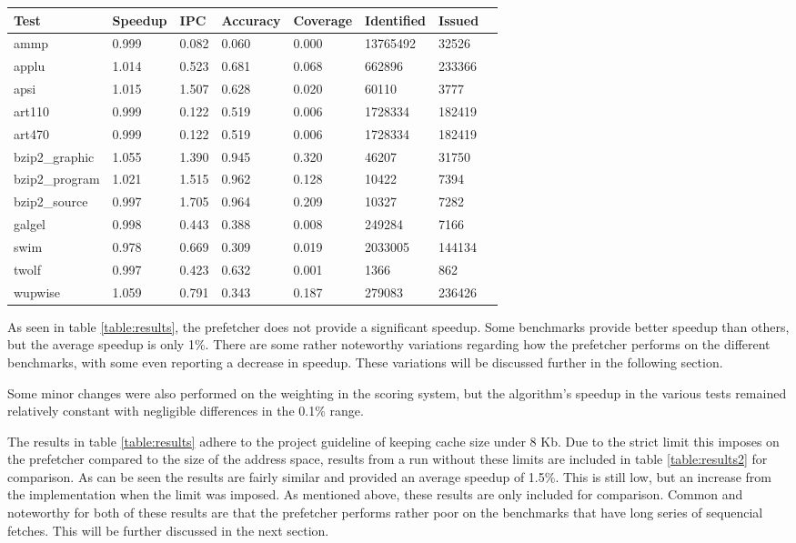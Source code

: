 

\begin{table*}[!t]
\renewcommand{\arraystretch}{1.3}
\caption{Prefetcher results from the Kongull Cluster}
\label{table:results}
\centering
\begin{tabular}{|l|l|l|l|l|l|l|l|}
\hline
\bfseries Test & \bfseries Speedup & \bfseries IPC & \bfseries Accuracy & \bfseries Coverage & \bfseries Identified & \bfseries Issued\\
\hline
\hline
ammp 		& 0.999 & 0.082 & 0.060 & 0.000 & 13765492 & 32526\\
applu 		& 1.014 & 0.523 & 0.681 & 0.068 & 662896   & 233366\\
apsi 		& 1.015 & 1.507 & 0.628 & 0.020 & 60110    & 3777\\	
art110 		& 0.999 & 0.122 & 0.519 & 0.006 & 1728334  & 182419\\	
art470 		& 0.999 & 0.122 & 0.519 & 0.006 & 1728334  & 182419\\
bzip2\_graphic 	& 1.055 & 1.390 & 0.945 & 0.320 & 46207    & 31750\\
bzip2\_program 	& 1.021 & 1.515 & 0.962 & 0.128 & 10422    & 7394\\
bzip2\_source 	& 0.997 & 1.705 & 0.964 & 0.209 & 10327    & 7282\\
galgel 		& 0.998 & 0.443 & 0.388 & 0.008 & 249284   & 7166\\
swim 		& 0.978 & 0.669 & 0.309 & 0.019 & 2033005  & 144134\\
twolf 		& 0.997 & 0.423 & 0.632 & 0.001 & 1366 	   & 862	\\
wupwise 	& 1.059 & 0.791 & 0.343 & 0.187 & 279083   & 236426\\
\hline
\end{tabular}
\end{table*}

As seen in table \ref{table:results}, the prefetcher does not provide a significant speedup. Some benchmarks provide better speedup than others, but the average speedup is only 1\%. There are some rather noteworthy variations regarding how the prefetcher performs on the different benchmarks, with some even reporting a decrease in speedup. These variations will be discussed further in the following section.

Some minor changes were also performed on the weighting in the scoring system, but the algorithm's speedup in the various tests remained relatively constant with negligible differences in the 0.1\% range.

The results in table \ref{table:results} adhere to the project guideline of keeping cache size under 8 Kb. Due to the strict limit this imposes on the prefetcher compared to the size of the address space, results from a run without these limits are included in table \ref{table:results2} for comparison.
As can be seen the results are fairly similar and provided an average speedup of 1.5\%. This is still low, but an increase from the implementation when the limit was imposed. As mentioned above, these results are only included for comparison.
Common and noteworthy for both of these results are that the prefetcher performs rather poor on the benchmarks that have long series of sequencial fetches. This will be further discussed in the next section.

